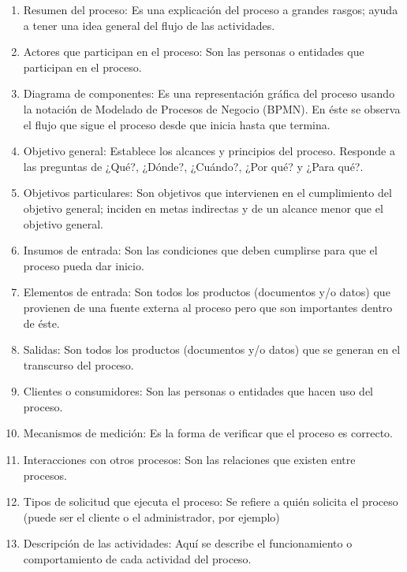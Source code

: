 \begin{enumerate}
	\item Resumen del proceso: Es una explicación del proceso a grandes rasgos; ayuda a tener una idea general del flujo de las actividades.
	\item Actores que participan en el proceso: Son las personas o entidades que participan en el proceso.
	\item Diagrama de componentes: Es una representación gráfica del proceso usando la notación de Modelado de Procesos de Negocio (BPMN). En éste se observa el flujo que sigue el
 proceso desde que inicia hasta que termina.
	\item Objetivo general: Establece los alcances y principios del proceso. Responde a las preguntas de ¿Qué?, ¿Dónde?, ¿Cuándo?, ¿Por qué? y ¿Para qué?.
	\item Objetivos particulares: Son objetivos que intervienen en el cumplimiento del objetivo general; inciden en metas indirectas y de un alcance menor que el objetivo general.
	\item Insumos de entrada: Son las condiciones que deben cumplirse para que el proceso pueda dar inicio.
	\item Elementos de entrada: Son todos los productos (documentos y/o datos) que provienen de una fuente externa al proceso pero que son importantes dentro de éste.
	\item Salidas: Son todos los productos (documentos y/o datos) que se generan en el transcurso del proceso.
	\item Clientes o consumidores: Son las personas o entidades que hacen uso del proceso.
	\item Mecanismos de medición: Es la forma de verificar que el proceso es correcto.
	\item Interacciones con otros procesos: Son las relaciones que existen entre procesos.
	\item Tipos de solicitud que ejecuta el proceso: Se refiere a quién solicita el proceso (puede ser el cliente o el administrador, por ejemplo)
	\item Descripción de las actividades: Aquí se describe el funcionamiento o comportamiento de cada actividad del proceso.
\end{enumerate}